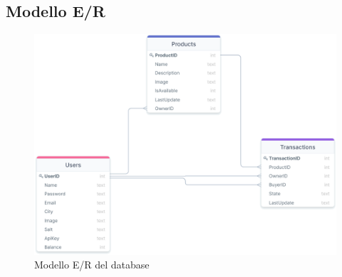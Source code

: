 \subsection{Modello E/R}
\begin{figure}[ht]
    \centering\includegraphics[scale=0.29]{images/modello_e_r.png}
    \caption{Modello E/R del database}
\end{figure}
